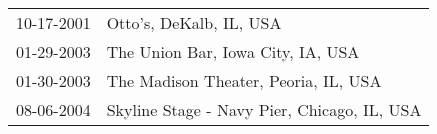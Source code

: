 \begin{supertabular}{ll}
 10-17-2001 &                      Otto's, DeKalb, IL, USA \\
 01-29-2003 &            The Union Bar, Iowa City, IA, USA \\
 01-30-2003 &         The Madison Theater, Peoria, IL, USA \\
 08-06-2004 &  Skyline Stage - Navy Pier, Chicago, IL, USA \\
\end{supertabular}
